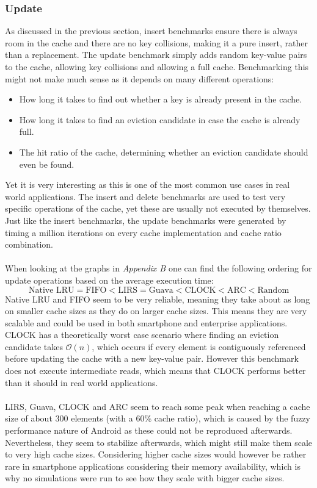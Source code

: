 \documentclass[pdftex,a4paper,12pt,twoside]{report}
\begin{document}
\subsubsection{Update}
As discussed in the previous section, insert benchmarks ensure there is always room in the cache and there are no key collisions, making it a pure insert, rather than a replacement. The update benchmark simply adds random key-value pairs to the cache, allowing key collisions and allowing a full cache. Benchmarking this might not make much sense as it depends on many different operations:
\begin{itemize}
\item How long it takes to find out whether a key is already present in the cache.
\item How long it takes to find an eviction candidate in case the cache is already full.
\item The hit ratio of the cache, determining whether an eviction candidate should even be found.
\end{itemize}
Yet it is very interesting as this is one of the most common use cases in real world applications. The insert and delete benchmarks are used to test very specific operations of the cache, yet these are usually not executed by themselves.
Just like the insert benchmarks, the update benchmarks were generated by timing a million iterations on every cache implementation and cache ratio combination.
\\\\
When looking at the graphs in \emph{Appendix B} one can find the following ordering for update operations based on the average execution time:
\[
\text{Native LRU} = \text{FIFO} < \text{LIRS} = \text{Guava} < \text{CLOCK} < \text{ARC} < \text{Random}
\]
Native LRU and FIFO seem to be very reliable, meaning they take about as long on smaller cache sizes as they do on larger cache sizes. This means they are very scalable and could be used in both smartphone and enterprise applications. CLOCK has a theoretically worst case scenario where finding an eviction candidate takes $\mathcal{O}(n)$, which occurs if every element is contiguously referenced before updating the cache with a new key-value pair. However this benchmark does not execute intermediate reads, which means that CLOCK performs better than it should in real world applications.
\\\\
LIRS, Guava, CLOCK and ARC seem to reach some peak when reaching a cache size of about 300 elements (with a 60\% cache ratio), which is caused by the fuzzy performance nature of Android as these could not be reproduced afterwards. Nevertheless, they seem to stabilize afterwards, which might still make them scale to very high cache sizes. Considering higher cache sizes would however be rather rare in smartphone applications considering their memory availability, which is why no simulations were run to see how they scale with bigger cache sizes.
\end{document}
